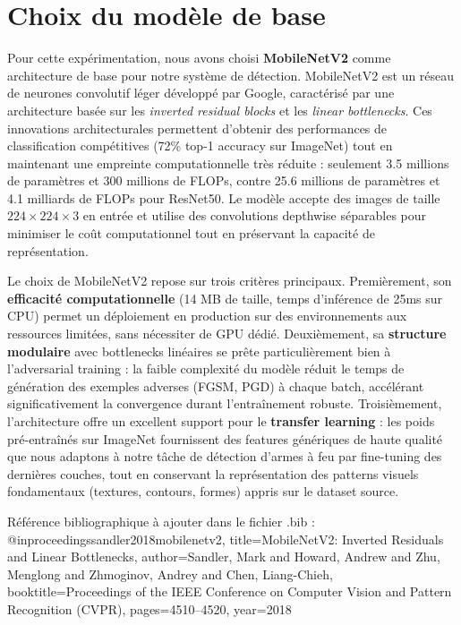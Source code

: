 \section{Choix du modèle de base}

Pour cette expérimentation, nous avons choisi \textbf{MobileNetV2} \cite{sandler2018mobilenetv2} comme architecture de base pour notre système de détection. MobileNetV2 est un réseau de neurones convolutif léger développé par Google, caractérisé par une architecture basée sur les \textit{inverted residual blocks} et les \textit{linear bottlenecks}. Ces innovations architecturales permettent d'obtenir des performances de classification compétitives (72\% top-1 accuracy sur ImageNet) tout en maintenant une empreinte computationnelle très réduite : seulement 3.5 millions de paramètres et 300 millions de FLOPs, contre 25.6 millions de paramètres et 4.1 milliards de FLOPs pour ResNet50. Le modèle accepte des images de taille $224 \times 224 \times 3$ en entrée et utilise des convolutions depthwise séparables pour minimiser le coût computationnel tout en préservant la capacité de représentation.

Le choix de MobileNetV2 repose sur trois critères principaux. Premièrement, son \textbf{efficacité computationnelle} (14 MB de taille, temps d'inférence de 25ms sur CPU) permet un déploiement en production sur des environnements aux ressources limitées, sans nécessiter de GPU dédié. Deuxièmement, sa \textbf{structure modulaire} avec bottlenecks linéaires se prête particulièrement bien à l'adversarial training : la faible complexité du modèle réduit le temps de génération des exemples adverses (FGSM, PGD) à chaque batch, accélérant significativement la convergence durant l'entraînement robuste. Troisièmement, l'architecture offre un excellent support pour le \textbf{transfer learning} : les poids pré-entraînés sur ImageNet fournissent des features génériques de haute qualité que nous adaptons à notre tâche de détection d'armes à feu par fine-tuning des dernières couches, tout en conservant la représentation des patterns visuels fondamentaux (textures, contours, formes) appris sur le dataset source.



Référence bibliographique à ajouter dans le fichier .bib :
@inproceedings{sandler2018mobilenetv2,
  title={MobileNetV2: Inverted Residuals and Linear Bottlenecks},
  author={Sandler, Mark and Howard, Andrew and Zhu, Menglong and Zhmoginov, Andrey and Chen, Liang-Chieh},
  booktitle={Proceedings of the IEEE Conference on Computer Vision and Pattern Recognition (CVPR)},
  pages={4510--4520},
  year={2018}
}